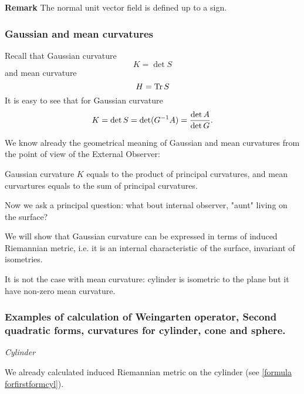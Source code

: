 \documentclass[12pt]{article}
\theoremstyle{theorem}
\numberwithin{equation}{section}
\begin{document}
{ {\bf Remark} The normal unit vector field is defined up to a sign.


\subsubsection {Gaussian and mean curvatures}

   Recall that Gaussian curvature
            $$
          K=\det S
            $$
and mean curvature
           $$
         H={\rm Tr \,}S
           $$
It is easy to see that  for Gaussian curvature
           $$
         K=\det S=\det(G^{-1}A)={\det A\over \det G}.
           $$

We know already the geometrical meaning of Gaussian and mean curvatures from the point of view of the External Observer:

Gaussian curvature $K$ equals to the product of principal curvatures, and mean curvartures equals to the sum of principal curvatures.

Now we ask a principal question: what bout internal observer, "aunt" living on the surface?

We will show that Gaussian curvature can be expressed in terms of induced Riemannian metric, i.e. it is an
 internal characteristic of the surface, invariant of isometries.

  It is not the case with mean curvature: cylinder is isometric to the plane but it have
   non-zero mean curvature.

\subsubsection {Examples of calculation of Weingarten operator,
Second quadratic forms, curvatures for cylinder, cone and sphere.}

\m

{\it Cylinder}

\m

  We already calculated induced Riemannian metric on the cylinder (see \eqref {formula forfirstformcyl}).

}
\end{document}
